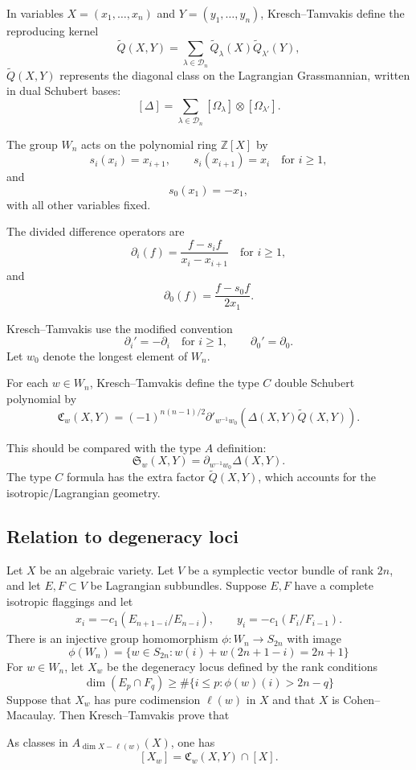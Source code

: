 \documentclass[12pt]{article}
\begin{document}
In variables $X=(x_1,\dots,x_n)$ and $Y=(y_1,\dots,y_n)$, Kresch--Tamvakis define the reproducing kernel
\[
    \widetilde Q(X,Y)
    =
    \sum_{\lambda\in \mathcal D_n}
    \widetilde Q_\lambda(X)
    \widetilde Q_{\lambda'}(Y),
\]
$\widetilde Q(X,Y)$ represents the diagonal class on the Lagrangian Grassmannian, written in dual Schubert bases:
\[
    [\Delta]
    =
    \sum_{\lambda\in\mathcal D_n}
    [\Omega_\lambda]\otimes [\Omega_{\lambda'}].
\]

The group $W_n$ acts on the polynomial ring $\mathbb Z[X]$ by
\[
    s_i(x_i)=x_{i+1},
    \qquad
    s_i(x_{i+1})=x_i
    \quad
    \text{for } i\ge 1,
\]
and
\[
    s_0(x_1)=-x_1,
\]
with all other variables fixed.
\begin{definition}
    The divided difference operators are
    \[
        \partial_i(f)
        =
        \frac{f-s_i f}{x_i-x_{i+1}}
        \quad
        \text{for } i\ge 1,
    \]
    and
    \[
        \partial_0(f)
        =
        \frac{f-s_0 f}{2x_1}.
    \]
\end{definition}
Kresch--Tamvakis use the modified convention
\[
    \partial_i'=-\partial_i
    \quad
    \text{for } i\ge 1,
    \qquad
    \partial_0'=\partial_0.
\]
Let $w_0$ denote the longest element of $W_n$.
\begin{definition}
    For each $w\in W_n$, Kresch--Tamvakis define the type $C$ double Schubert polynomial by
    \[
        \mathfrak C_w(X,Y)
        =
        (-1)^{n(n-1)/2}
        \partial'_{w^{-1}w_0}
        \left(
        \Delta(X,Y)\widetilde Q(X,Y)
        \right).
    \]
\end{definition}
This should be compared with the type $A$ definition:
\[
    \mathfrak S_w(X,Y)
    =
    \partial_{w^{-1}w_0}\Delta(X,Y).
\]
The type $C$ formula has the extra factor $\widetilde Q(X,Y)$, which accounts for the isotropic/Lagrangian geometry.


\subsection{Relation to degeneracy loci}
Let $X$ be an algebraic variety. Let $V$ be a symplectic vector bundle of rank $2n$, and let $E,F\subset V$
be Lagrangian subbundles. Suppose $E,F$ have a complete isotropic flaggings and let \begin{align*}
    x_i=-c_1(E_{n+1-i}/E_{n-i}),\qquad
    y_i=-c_1(F_i/F_{i-1}).
\end{align*} There is an injective group homomorphism $\phi:W_n\to S_{2n}$ with image \[
    \phi(W_n)=\{w\in S_{2n}:w(i)+w(2n+1-i)=2n+1\}\]
For $w\in W_n$, let $X_w$ be the degeneracy locus defined by the rank conditions
\[
    \dim(E_p\cap F_q)\geq \#\{i\le p: \phi(w)(i)> 2n-q\}
\]
Suppose that $X_w$ has pure codimension $\ell(w)$ in $X$ and that $X$ is Cohen--Macaulay. Then Kresch--Tamvakis prove that
\begin{theorem}
     As classes in $A_{\dim X-\ell(w)}(X)$, one has
    \[
        [X_w]
        =
        \mathfrak C_w(X,Y)\cap [X].
    \]
\end{theorem}
\end{document}
